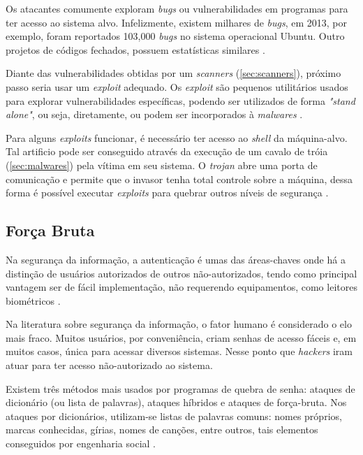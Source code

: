 Os atacantes comumente exploram \textit{bugs} ou vulnerabilidades em programas para ter acesso ao sistema alvo. Infelizmente, existem milhares de \textit{bugs}, em 2013, por exemplo, foram reportados 103,000 \textit{bugs} no sistema operacional Ubuntu. Outro projetos de códigos fechados, possuem estatísticas similares \cite{aeg:thanassis}.

Diante das vulnerabilidades obtidas por um \textit{scanners} (\autoref{sec:scanners}), próximo passo seria usar um \textit{exploit} adequado. Os \textit{exploit} são pequenos utilitários usados para explorar vulnerabilidades específicas, podendo ser utilizados de forma \textit{"stand alone"}, ou seja, diretamente, ou podem ser incorporados à \textit{malwares} \cite{exploit:cassio}.

Para alguns \textit{exploits} funcionar, é necessário ter acesso ao \textit{shell} da máquina-alvo. Tal artificio pode ser conseguido através da execução de um cavalo de tróia (\autoref{sec:malwares}) pela vítima em seu sistema. O \textit{trojan} abre uma porta de comunicação e permite que o invasor tenha total controle sobre a máquina, dessa forma é possível executar \textit{exploits} para quebrar outros níveis de segurança \cite{univhacker}.

\subsection{Força Bruta} \label{sec:forçabruta}

Na segurança da informação, a autenticação é umas das áreas-chaves onde há a distinção de usuários autorizados de outros não-autorizados, tendo como principal vantagem ser de fácil implementação, não requerendo equipamentos, como leitores biométricos \cite{denise-lilian}.

Na literatura sobre segurança da informação, o fator humano é considerado o elo mais fraco. Muitos usuários, por conveniência, criam senhas de acesso fáceis e, em muitos casos, única para acessar diversos sistemas. Nesse ponto que \textit{hackers} iram atuar para ter acesso não-autorizado ao sistema. 

Existem três métodos mais usados por programas de quebra de senha: ataques de dicionário (ou lista de palavras), ataques híbridos e ataques de força-bruta. Nos ataques por dicionários, utilizam-se listas de palavras comuns: nomes próprios, marcas conhecidas, gírias, nomes de canções, entre outros, tais elementos conseguidos por engenharia social \cite{univhacker}. 

